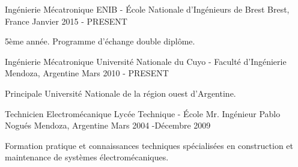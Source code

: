 
\begin{cventries}
  \cventry
    {Ingénierie Mécatronique} %
    {ENIB - École Nationale d'Ingénieurs de Brest} %
    {Brest, France} %
    {Janvier 2015 - PRESENT} %
    {
      \begin{cvitems} %
        \item {5ème année. Programme d'échange double diplôme.}
      \end{cvitems}
    }

\cventry
{Ingénierie Mécatronique} %
{Université Nationale du Cuyo - Faculté d'Ingénierie} %
{Mendoza, Argentine} %
{Mars 2010 - PRESENT} %
{
	\begin{cvitems} %
		\item {Principale Université Nationale de la région ouest d'Argentine.}
	\end{cvitems}
}


\cventry
{Technicien Electromécanique} %
{Lycée Technique - École Mr. Ingénieur Pablo Nogués} %
{Mendoza, Argentine} %
{Mars 2004 -Décembre 2009} %
{
	\begin{cvitems} %
		\item { Formation pratique et connaissances techniques spécialisées en construction et maintenance de systèmes électromécaniques.}
	\end{cvitems}
}






\end{cventries}
